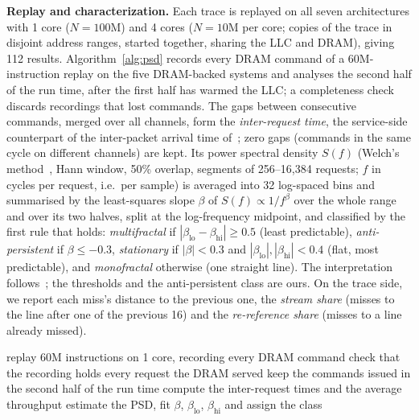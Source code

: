 \documentclass[conference]{IEEEtran}
\begin{document}
\textbf{Replay and characterization.} Each trace is replayed on all seven architectures with 1 core ($N=100$M) and 4 cores ($N=10$M per core; copies of the trace in disjoint address ranges, started together, sharing the LLC and DRAM), giving 112 results. Algorithm~\ref{alg:psd} records every DRAM command of a 60M-instruction replay on the five DRAM-backed systems and analyses the second half of the run time, after the first half has warmed the LLC; a completeness check discards recordings that lost commands. The gaps between consecutive commands, merged over all channels, form the \emph{inter-request time}, the service-side counterpart of the inter-packet arrival time of~\cite{agarwal2025}; zero gaps (commands in the same cycle on different channels) are kept. Its power spectral density $S(f)$ (Welch's method~\cite{welch1967}, Hann window, 50\% overlap, segments of 256--16,384 requests; $f$ in cycles per request, i.e.\ per sample) is averaged into 32 log-spaced bins and summarised by the least-squares slope $\beta$ of $S(f)\propto 1/f^{\beta}$ over the whole range and over its two halves, split at the log-frequency midpoint, and classified by the first rule that holds: \emph{multifractal} if $|\beta_{\mathrm{lo}}-\beta_{\mathrm{hi}}|\ge0.5$ (least predictable), \emph{anti-persistent} if $\beta\le-0.3$, \emph{stationary} if $|\beta|<0.3$ and $|\beta_{\mathrm{lo}}|,|\beta_{\mathrm{hi}}|<0.4$ (flat, most predictable), and \emph{monofractal} otherwise (one straight line). The interpretation follows~\cite{agarwal2025}; the thresholds and the anti-persistent class are ours. On the trace side, we report each miss's distance to the previous one, the \emph{stream share} (misses to the line after one of the previous 16) and the \emph{re-reference share} (misses to a line already missed).

\begin{algorithm}[t]
\caption{Controller-level characterization}
\label{alg:psd}
\begin{algorithmic}[1]
  \STATE replay 60M instructions on 1 core, recording every DRAM command
  \STATE check that the recording holds every request the DRAM served
  \STATE keep the commands issued in the second half of the run time
  \STATE compute the inter-request times and the average throughput
  \STATE estimate the PSD, fit $\beta$, $\beta_{\mathrm{lo}}$, $\beta_{\mathrm{hi}}$ and assign the class
\ENDFOR
\end{algorithmic}
\end{algorithm}
\end{document}
